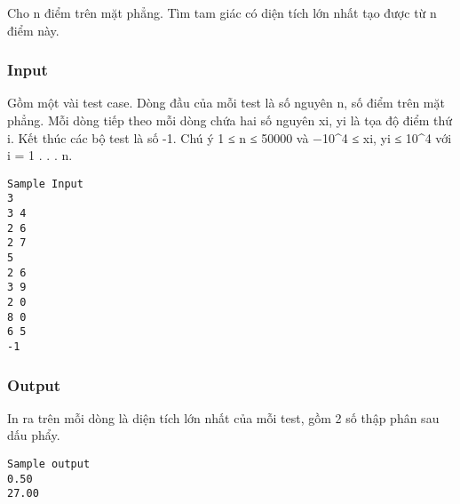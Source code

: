 









   Cho n điểm trên mặt phẳng. Tìm tam giác có diện tích lớn nhất tạo được từ n điểm này.  



\subsubsection{   Input  }



   Gồm một vài test case. Dòng đầu của mỗi test là số nguyên n, số điểm trên mặt phẳng.  Mỗi dòng tiếp theo mỗi dòng chứa hai số nguyên xi, yi là tọa độ điểm thứ i.  Kết thúc các bộ test là số -1.  Chú ý 1 ≤ n ≤ 50000 và −10\textasciicircum4 ≤ xi, yi ≤ 10\textasciicircum4 với i = 1 . . . n.  
\begin{verbatim}
Sample Input
3
3 4
2 6
2 7
5
2 6
3 9
2 0
8 0
6 5
-1
\end{verbatim}

\subsubsection{   Output  }



   In ra trên mỗi dòng là diện tích lớn nhất của mỗi test, gồm 2 số thập phân  sau dấu phẩy.  
\begin{verbatim}
Sample output
0.50
27.00
\end{verbatim}

